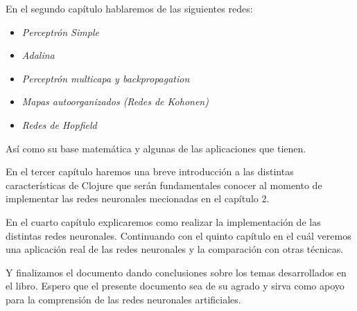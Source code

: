 \begin{prefacio}
  En el segundo capítulo hablaremos de las siguientes redes:

  \begin{itemize}
  \item \textsl{Perceptrón Simple}
  \item \textsl{Adalina}
  \item \textsl{Perceptrón multicapa y backpropagation}
  \item \textsl{Mapas autoorganizados (Redes de Kohonen)}
  \item \textsl{Redes de Hopfield}
  \end{itemize}

  Así como su base matemática y algunas de las aplicaciones que
  tienen.

  En el tercer capítulo haremos una breve introducción a las distintas
  características de Clojure que serán fundamentales conocer al
  momento de implementar las redes neuronales mecionadas en el
  capítulo 2.

  En el cuarto capítulo explicaremos como realizar la implementación
  de las distintas redes neuronales. Continuando con el quinto
  capítulo en el cuál veremos una aplicación real de las redes
  neuronales y la comparación con otras técnicas.

  Y finalizamos el documento dando conclusiones sobre los temas
  desarrollados en el libro. Espero que el presente documento sea de
  su agrado y sirva como apoyo para la comprensión de las redes
  neuronales artificiales.


\end{prefacio}